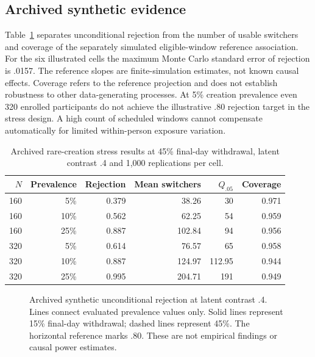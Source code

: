 \documentclass[11pt]{article}
\begin{document}
\subsection{Archived synthetic evidence}
Table~\ref{tab:rare-creation} separates unconditional rejection from the number of usable switchers and coverage of the separately simulated eligible-window reference association. For the six illustrated cells the maximum Monte Carlo standard error of rejection is .0157. The reference slopes are finite-simulation estimates, not known causal effects. Coverage refers to the reference projection and does not establish robustness to other data-generating processes. At 5\% creation prevalence even 320 enrolled participants do not achieve the illustrative .80 rejection target in the stress design. A high count of scheduled windows cannot compensate automatically for limited within-person exposure variation.

\begin{table}[htbp]
\centering\small
\caption{Archived rare-creation stress results at 45\% final-day withdrawal, latent contrast .4 and 1,000 replications per cell.}
\label{tab:rare-creation}
\begin{tabular}{@{}rrrrrr@{}}
\toprule
$N$ & Prevalence & Rejection & Mean switchers & $Q_{.05}$ & Coverage\\
\midrule
160 & 5\% & 0.379 & 38.26 & 30 & 0.971 \\
160 & 10\% & 0.562 & 62.25 & 54 & 0.959 \\
160 & 25\% & 0.887 & 102.84 & 94 & 0.956 \\
320 & 5\% & 0.614 & 76.57 & 65 & 0.958 \\
320 & 10\% & 0.887 & 124.97 & 112.95 & 0.944 \\
320 & 25\% & 0.995 & 204.71 & 191 & 0.949 \\
\bottomrule
\end{tabular}
\end{table}

\begin{figure}[htbp]
\centering

\caption{Archived synthetic unconditional rejection at latent contrast .4. Lines connect evaluated prevalence values only. Solid lines represent 15\% final-day withdrawal; dashed lines represent 45\%. The horizontal reference marks .80. These are not empirical findings or causal power estimates.}
\label{fig:rare-creation}
\end{figure}
\end{document}
